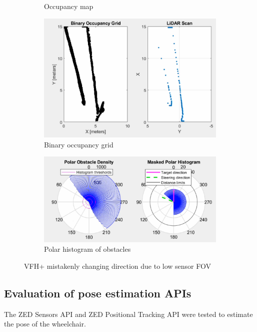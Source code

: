 \begin{figure}[p]
\begin{subfigure}{.2\textwidth}
        \caption{Occupancy map}
    \end{subfigure}
    \begin{subfigure}{.4\textwidth}
        \centering
        \includegraphics[width=\linewidth]{images/vfh_fov_lidar.PNG}
        \caption{Binary occupancy grid}
    \end{subfigure}
    \quad
    \begin{subfigure}{.55\textwidth}
        \centering
        \includegraphics[width=\linewidth]{images/vfh_fov_hist.PNG}
        \caption{Polar histogram of obstacles}
    \end{subfigure}
    \caption{VFH+ mistakenly changing direction due to low sensor FOV}
    \label{fig:vfh_mistake}
\end{figure}\clearpage
\setlength{\abovecaptionskip}{12pt}

\subsection{Evaluation of pose estimation APIs}
The ZED Sensors API and ZED Positional Tracking API
were tested to estimate the pose of the wheelchair.


